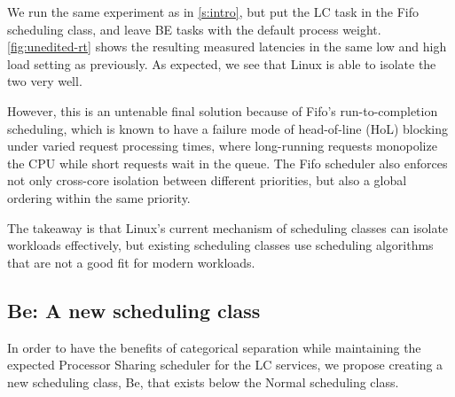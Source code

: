 We run the same experiment as in \autoref{s:intro}, but put the LC task in the
Fifo scheduling class, and leave BE tasks with the default process weight.
\autoref{fig:unedited-rt} shows the resulting measured latencies in the same low
and high load setting as previously. As expected, we see that Linux is able to
isolate the two very well. 

However, this is an untenable final solution because of Fifo's run-to-completion
scheduling, which is known to have a failure mode of head-of-line (HoL) blocking
under varied request processing times, where long-running requests monopolize
the CPU while short requests wait in the queue. The Fifo scheduler also enforces
not only cross-core isolation between different priorities, but also a global
ordering within the same priority.

The takeaway is that Linux's current mechanism of scheduling classes can isolate
workloads effectively, but existing scheduling classes use scheduling
algorithms that are not a good fit for modern workloads.

\subsection{Be: A new scheduling class}



In order to have the benefits of categorical separation while maintaining the
expected Processor Sharing scheduler for the LC services, we propose creating a
new scheduling class, Be, that exists below the Normal scheduling class.



